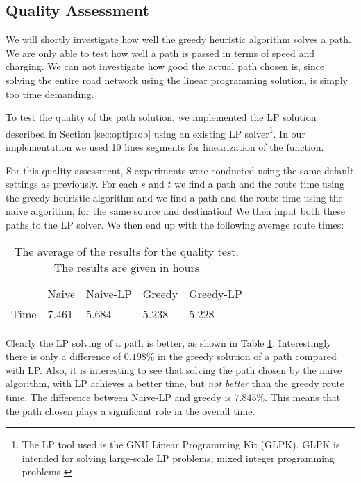 \subsection{Quality Assessment}
We will shortly investigate how well the greedy heuristic algorithm solves a path. We are only able to test how well a path is passed in terms of speed and charging. We can not investigate how good the actual path chosen is, since solving the entire road network using the linear programming solution, is simply too time demanding. 

To test the quality of the path solution, we implemented the LP solution described in Section \ref{sec:optiprob} using an existing LP solver\footnote{The LP tool used is the GNU Linear Programming Kit (GLPK). GLPK is intended for solving large-scale LP problems, mixed integer programming problems \cite{glpk}}. In our implementation we used 10 lines segments for linearization of the function. 

For this quality assessment, 8 experiments were conducted using the same default settings as previously. For each $s$ and $t$ we find a path and the route time using the greedy heuristic algorithm and we find a path and the route time using the naive algorithm, for the same source and destination! We then input both these paths to the LP solver. We then end up with the following average route times:
\begin{table}[!htb]
\begin{tabular}{ p{1cm} p{1.35cm} p{1.35cm} p{1.25cm} p{1.6cm}}
\hline
& Naive & Naive-LP  & Greedy  & Greedy-LP \\
Time & 7.461& 5.684 & 5.238 & 5.228\\
\hline
\end{tabular}
\caption{The average of the results for the quality test. The results are given in hours}
\label{tab:LP}
\end{table}

Clearly the LP solving of a path is better, as shown in Table \ref{tab:LP}. Interestingly there is only a difference of $0.198\%$ in the greedy solution of a path compared with LP. Also, it is interesting to see that solving the path chosen by the naive algorithm, with LP achieves a better time, but \emph{not better} than the greedy route time. The difference between Naive-LP and greedy is $7.845\%$. This means that the path chosen plays a significant role in the overall time.